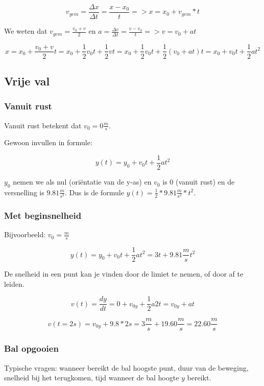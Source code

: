 \[ v_{gem} = \frac{\Delta x}{\Delta t} = \frac{x - x_0}{t} => x = x_0 + v_{gem} * t \]

We weten dat \( v_{gem} = \frac{v_0 + v}{2} \) en \( a = \frac{\Delta v}{\Delta t} = \frac{v - v_0}{t} => v = v_0 + at \)


\[ x = x_0 + \frac{v_0 + v}{2}t
 = x_0 + \frac{1}{2} v_0 t + \frac{1}{2} v t
 = x_0 + \frac{1}{2} v_0 t + \frac{1}{2} \left(  v_0 + at \right) t = x_0 + v_0 t + \frac{1}{2} a t^2 \]
 
 \subsection{Vrije val}
 
 \subsubsection{Vanuit rust}
 
 Vanuit rust betekent dat \(v_0 = 0 \frac{m}{s}\).
 
 Gewoon invullen in formule:
 
 \[
 y(t) = y_0 + v_0t + \frac{1}{2} a t^2
 \]
 
 \(y_0\) nemen we als nul (oriëntatie van de y-as) en \(v_0\) is 0 (vanuit rust) en de versnelling is \(9.81 \frac{m}{s^2}\). Dus is de formule \( y(t) = \frac{1}{2} * 9.81 \frac{m}{s^2} * t^2  \).
 
 \subsubsection{Met beginsnelheid}
 
 Bijvoorbeeld: \( v_0 = \frac{m}{s}\)
 
 \[
 y(t) = y_0 + v_0 t + \frac{1}{2} a t^2 = 3t + 9.81 \frac{m}{s} t^2
 \]
 
 De snelheid in een punt kan je vinden door de limiet te nemen, of door af te leiden.
 
 \[ v(t) = \frac{dy}{dt} = 0 + v_{0y} + \frac{1}{2}a2t = v_{0y} + at \]
 
 \[ v(t=2s) = v_{0y} + 9.8 * 2s = 3 \frac{m}{s} + 19.60 \frac{m}{s} = 22.60 \frac{m}{s} \]
 
 \subsubsection{Bal opgooien}
 
 Typische vragen: wanneer bereikt de bal hoogste punt, duur van de beweging, snelheid bij het terugkomen, tijd wanneer de bal hoogte \(y\) bereikt.
 
